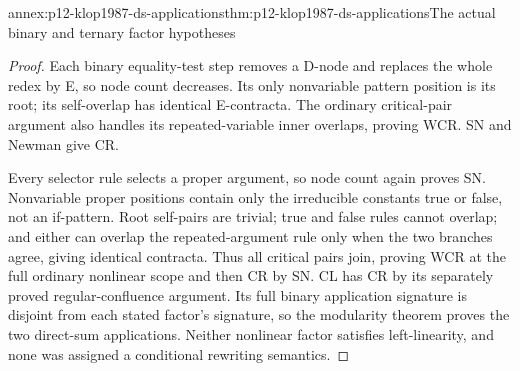 \begin{annexitem}{annex:p12-klop1987-ds-applications}{thm:p12-klop1987-ds-applications}{The actual binary and ternary factor hypotheses}
\begin{proof}
Each binary equality-test step removes a D-node and replaces
the whole redex by E, so node count decreases. Its only
nonvariable pattern position is its root; its self-overlap
has identical E-contracta. The ordinary critical-pair argument
also handles its repeated-variable inner overlaps, proving WCR.
SN and Newman give CR.

Every selector rule selects a proper argument, so node count
again proves SN. Nonvariable proper positions contain only
the irreducible constants true or false, not an if-pattern.
Root self-pairs are trivial; true and false rules cannot
overlap; and either can overlap the repeated-argument rule
only when the two branches agree, giving identical contracta.
Thus all critical pairs join, proving WCR at the full ordinary
nonlinear scope and then CR by SN. CL has CR by its separately
proved regular-confluence argument. Its full binary application
signature is disjoint from each stated factor's signature,
so the modularity theorem proves the two direct-sum applications.
Neither nonlinear factor satisfies left-linearity, and none
was assigned a conditional rewriting semantics.
\end{proof}
\end{annexitem}
